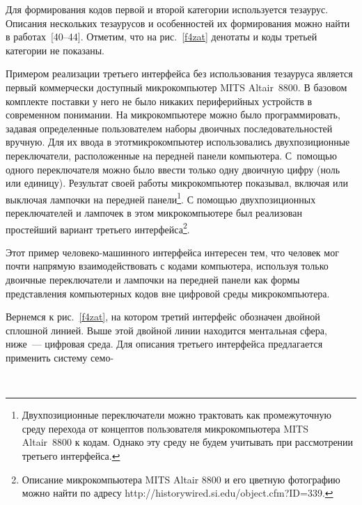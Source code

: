 \begin{multicols}{2}
   Для формирования кодов первой и второй категории используется тезаурус. Описания 
нескольких тезаурусов и особенностей их формирования можно найти в работах~[40--44]. 
Отметим, что на рис.~\ref{f4zat} денотаты и коды третьей категории не 
показаны.
   
   Примером реализации третьего интерфейса без использования тезауруса является первый 
коммерчески доступный микрокомпьютер MITS \mbox{Altair}~8800. В базовом комплекте поставки 
у него не было никаких периферийных устройств в современном понимании. На 
микрокомпьютере можно было программировать, задавая определенные пользователем наборы двоичных 
по\-сле\-до\-ватель\-ностей вручную. Для их ввода в этот\linebreak микрокомпьютер использовались 
двухпозиционные переключатели, расположенные на передней панели компьютера.
 С~помощью одного переключателя можно было ввести только одну двоичную цифру (ноль или 
единицу). Результат своей работы микрокомпьютер показывал, включая или выключая 
лампочки на передней панели\footnote{Двухпозиционные переключатели можно трактовать как 
промежуточную среду перехода от концептов пользователя микрокомпьютера MITS Altair~8800 к кодам. 
Однако эту среду не будем учитывать при рассмотрении третьего интерфейса.}. С по\-мощью 
двухпозиционных переключателей и лампочек в этом микрокомпьютере был реализован 
простейший вариант третьего интерфейса\footnote{Описание микрокомпьютера MITS Altair 8800 и его 
цветную фотографию можно найти по адресу {\sf http://historywired.si.edu/\linebreak object.cfm?ID=339}.}.
   
   Этот пример человеко-машинного интерфейса интересен тем, что человек мог почти 
напрямую взаимодействовать с кодами компьютера, используя только двоичные 
переключатели и лампочки на передней панели как формы представления компьютерных 
кодов вне цифровой среды микрокомпьютера.

  
   Вернемся к рис.~\ref{f4zat}, на котором третий интерфейс обозначен двойной сплошной 
линией. Выше этой двойной линии находится ментальная сфера, ниже~--- цифровая среда. 
Для описания третьего интерфейса предлагается применить систему семо-\linebreak\vspace*{-12pt}
\pagebreak

\end{multicols}
\begin{figure} %
\vspace*{1pt}
\begin{center}
\vspace*{1pt}
\mbox{%
\epsfxsize=163.074mm
}
\end{center}
\vspace*{-9pt}
\end{figure}

